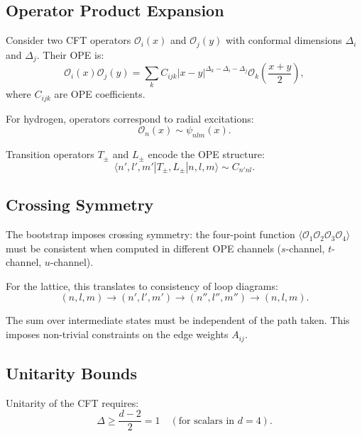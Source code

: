 \documentclass[aps,prd,twocolumn,superscriptaddress,floatfix]{revtex4-2}
\begin{document}
\subsection{Operator Product Expansion}

Consider two CFT operators $\mathcal{O}_i(x)$ and $\mathcal{O}_j(y)$ with conformal dimensions $\Delta_i$ and $\Delta_j$. Their OPE is:
\begin{equation}
\mathcal{O}_i(x) \mathcal{O}_j(y) = \sum_k C_{ijk} |x-y|^{\Delta_k - \Delta_i - \Delta_j} \mathcal{O}_k\left(\frac{x+y}{2}\right),
\end{equation}
where $C_{ijk}$ are OPE coefficients.

For hydrogen, operators correspond to radial excitations:
\begin{equation}
\mathcal{O}_n(x) \sim \psi_{nlm}(x).
\end{equation}

Transition operators $T_\pm$ and $L_\pm$ encode the OPE structure:
\begin{equation}
\langle n', l', m' | T_\pm, L_\pm | n, l, m \rangle \sim C_{n'nl}.
\end{equation}

\subsection{Crossing Symmetry}

The bootstrap imposes crossing symmetry: the four-point function $\langle \mathcal{O}_1 \mathcal{O}_2 \mathcal{O}_3 \mathcal{O}_4 \rangle$ must be consistent when computed in different OPE channels ($s$-channel, $t$-channel, $u$-channel).

For the lattice, this translates to consistency of loop diagrams:
\begin{equation}
(n,l,m) \to (n',l',m') \to (n'',l'',m'') \to (n,l,m).
\end{equation}

The sum over intermediate states must be independent of the path taken. This imposes non-trivial constraints on the edge weights $A_{ij}$.

\subsection{Unitarity Bounds}

Unitarity of the CFT requires:
\begin{equation}
\Delta \geq \frac{d-2}{2} = 1 \quad (\text{for scalars in } d=4).
\end{equation}
\end{document}
